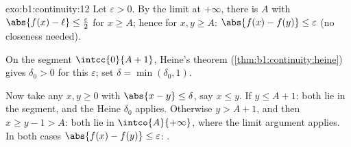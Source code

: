 \begin{solution}{exo:b1:continuity:12}
Let $\varepsilon > 0$. By the limit at $+\infty$, there is $A$ with
$\abs{f(x) - \ell} \leq \frac\varepsilon2$ for $x \geq A$; hence for
$x, y \geq A$: $\abs{f(x) - f(y)} \leq \varepsilon$ (no closeness
needed).

On the segment $\intcc{0}{A + 1}$, Heine's theorem
(\cref{thm:b1:continuity:heine}) gives $\delta_0 > 0$ for this
$\varepsilon$; set $\delta = \min(\delta_0, 1)$.

Now take any $x, y \geq 0$ with $\abs{x - y} \leq \delta$, say $x
\leq y$. If $y \leq A + 1$: both lie in the segment, and the Heine
$\delta_0$ applies. Otherwise $y > A + 1$, and then $x \geq y - 1 >
A$: both lie in $\intco{A}{+\infty}$, where the limit argument
applies. In both cases $\abs{f(x) - f(y)} \leq \varepsilon$: .
\end{solution}

